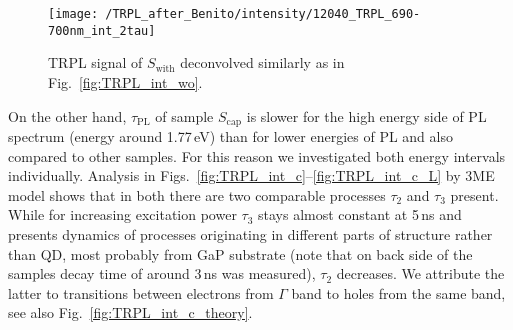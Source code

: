 %
%
\begin{figure}[!ht]
	\centering
	\texttt{[image: /TRPL\_after\_Benito/intensity/12040\_TRPL\_690-700nm\_int\_2tau]} %
	\caption{TRPL signal of $S_\mathrm{with}$ deconvolved similarly as in Fig.~\ref{fig:TRPL_int_wo}.}
	\label{fig:TRPL_int_w}
\end{figure}



On the other hand, $\tau_\mathrm{PL}$ of sample $S_\mathrm{cap}$ is slower for the high energy side of PL spectrum (energy around 1.77$\,$eV) than for lower energies of PL and also compared to other samples. For this reason we investigated both energy intervals individually. Analysis in {Figs.~\ref{fig:TRPL_int_c}--\ref{fig:TRPL_int_c_L}} by 3ME model shows that in both there are two comparable processes $\tau_2$ and $\tau_3$ present. While for increasing excitation power $\tau_3$ stays almost constant at 5$\,$ns and presents dynamics of processes originating in different parts of structure rather than QD, most probably from GaP substrate (note that on back side of the samples decay time of around 3$\,$ns was measured), $\tau_2$ decreases. We attribute the latter to transitions between electrons from $\Gamma$ band to holes from the same band, see also Fig.~\ref{fig:TRPL_int_c_theory}.








